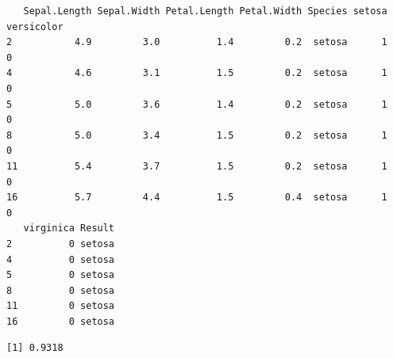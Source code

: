 \documentclass[12pt,brazil,oneside]{book}
\newenvironment{Shaded}{\begin{snugshade}}{\end{snugshade}}
\newcommand{\DecValTok}[1]{\textcolor[rgb]{0.00,0.00,0.81}{#1}}
\newcommand{\FloatTok}[1]{\textcolor[rgb]{0.00,0.00,0.81}{#1}}
\newcommand{\KeywordTok}[1]{\textcolor[rgb]{0.13,0.29,0.53}{\textbf{#1}}}
\newcommand{\NormalTok}[1]{#1}
\newcommand{\OperatorTok}[1]{\textcolor[rgb]{0.81,0.36,0.00}{\textbf{#1}}}
\newcommand{\StringTok}[1]{\textcolor[rgb]{0.31,0.60,0.02}{#1}}
\begin{document}
\begin{Shaded}
\end{Shaded}

\begin{verbatim}
   Sepal.Length Sepal.Width Petal.Length Petal.Width Species setosa versicolor
2           4.9         3.0          1.4         0.2  setosa      1          0
4           4.6         3.1          1.5         0.2  setosa      1          0
5           5.0         3.6          1.4         0.2  setosa      1          0
8           5.0         3.4          1.5         0.2  setosa      1          0
11          5.4         3.7          1.5         0.2  setosa      1          0
16          5.7         4.4          1.5         0.4  setosa      1          0
   virginica Result
2          0 setosa
4          0 setosa
5          0 setosa
8          0 setosa
11         0 setosa
16         0 setosa
\end{verbatim}

\begin{Shaded}
\end{Shaded}

\begin{verbatim}
[1] 0.9318
\end{verbatim}
\end{document}
